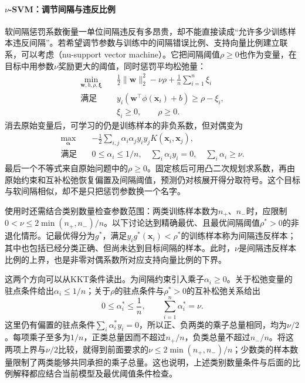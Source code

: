 \paragraph{$\nu$-SVM：调节间隔与违反比例}
\label{sec:classification-svm-nu-extension}
软间隔惩罚系数衡量一单位间隔违反有多昂贵，却不能直接读成“允许多少训练样本违反间隔”。若希望调节参数与训练中的间隔错误比例、支持向量比例建立联系，可以考虑（nu-support vector machine）。它把间隔阈值$\rho\geq0$也作为变量，在目标中用参数$\nu$奖励更大的阈值，同时惩罚平均松弛量：
\begin{equation}
  \begin{aligned}
    \min_{\bm{w},b,\rho,\bm{\xi}}\quad&
      \frac12\lVert\bm{w}\rVert_2^2-\nu\rho
      +\frac1n\sum_{i=1}^n\xi_i\\
    \text{满足}\quad&
      y_i(\bm{w}^{\top}\phi(\bm{x}_i)+b)\geq\rho-\xi_i,\\
    &\xi_i\geq0,\qquad \rho\geq0.
  \end{aligned}
  \label{eq:classification-nu-svm}
\end{equation}
消去原始变量后，可学习的仍是训练样本的非负系数，但对偶变为
\[
  \begin{aligned}
    \max_{\bm\alpha}\quad&-\frac12\sum_{i,j}\alpha_i\alpha_jy_iy_jK(\bm x_i,\bm x_j),\\
    \text{满足}\quad&0\leq\alpha_i\leq1/n,\quad
       \sum_i\alpha_i y_i=0,\quad\sum_i\alpha_i\geq\nu.
  \end{aligned}
\]
最后一个不等式来自原始问题中的$\rho\geq0$。固定核后可用凸二次规划求系数，再由原始约束和互补松弛恢复偏置及间隔阈值，预测仍对核展开得分取符号。这个目标与软间隔相似，却不是只把惩罚参数换一个名字。

使用时还需结合类别数量检查参数范围：两类训练样本数为$n_+$、$n_-$时，应限制$0<\nu\leq2\min(n_+,n_-)/n$。以下讨论达到精确最优、且最优间隔阈值$\rho^\ast>0$的非退化情形。记最优得分为$g^\ast$，满足$y_i g^\ast(\bm{x}_i)<\rho^\ast$的训练样本称为间隔违反样本；其中也包括已经分类正确、但尚未达到目标间隔的样本。此时，$\nu$是间隔违反样本比例的上界，也是非零对偶系数所对应支持向量比例的下界。

这两个方向可以从KKT条件读出。为间隔约束引入乘子$\alpha_i\geq0$。关于松弛变量的驻点条件给出$\alpha_i\leq1/n$；关于$\rho$的驻点条件与$\rho^\ast>0$的互补松弛关系给出
\[
  0\leq\alpha_i^\ast\leq\frac1n,
  \qquad \sum_{i=1}^{n}\alpha_i^\ast=\nu.
\]
这里仍有偏置的驻点条件$\sum_i\alpha_i^\ast y_i=0$，所以正、负两类的乘子总量相同，均为$\nu/2$。每项乘子至多为$1/n$，正类总量因而不超过$n_+/n$，负类总量不超过$n_-/n$。将这两项上界与$\nu/2$比较，就得到前面要求的$\nu\leq2\min(n_+,n_-)/n$；少数类的样本数量限制了两类能够共同承担的乘子总量。这也说明，上述类别数量条件与后面的比例解释都应结合当前模型及最优阈值条件检查。

